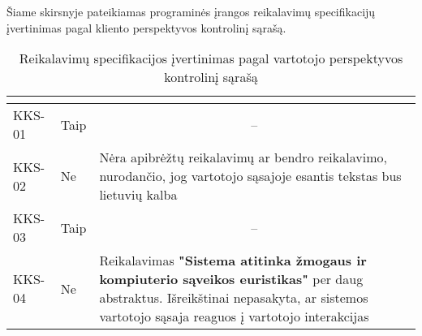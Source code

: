 \documentclass{VUMIFPSkursinis}
\begin{document}
Šiame skirsnyje pateikiamas programinės įrangos reikalavimų specifikacijų įvertinimas pagal kliento perspektyvos kontrolinį sąrašą.
\begin{center}

	\begin{longtable}{|C{2cm}|L{2.5cm}|L{10cm}|}

		\caption{Reikalavimų specifikacijos įvertinimas pagal vartotojo perspektyvos kontrolinį sąrašą}
		\label{table:VKS}

		\\ \hline
		 &
		 &
		\\ \hline
		KKS-01                                          &
		Taip                                            &
		                                                                                                                                                                                                                                          \\ \hline
		KKS-02                                          &
		Ne                                              &
		Nėra apibrėžtų reikalavimų ar bendro reikalavimo, nurodančio, jog vartotojo sąsajoje esantis tekstas bus lietuvių kalba                                                                                                                                           \\ \hline
		KKS-03                                          &
		Taip                                            &
		                                                                                                                                                                                                                                          \\ \hline
		KKS-04                                          &
		Ne                                              &
		Reikalavimas \textbf{"Sistema atitinka žmogaus ir kompiuterio sąveikos euristikas"} per daug abstraktus. Išreikštinai nepasakyta, ar sistemos vartotojo sąsaja reaguos į vartotojo interakcijas                                                                   \\ \hline

\end{longtable}
\end{center}
\end{document}
